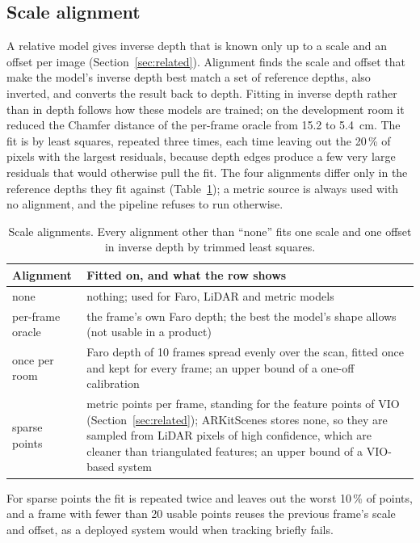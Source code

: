 \subsection{Scale alignment}\label{sec:align}
A relative model gives inverse depth that is known only up to a scale and an offset per image
(Section~\ref{sec:related}). Alignment finds the scale and offset that make the model's inverse depth best match a set
of reference depths, also inverted, and converts the result back to depth. Fitting in inverse depth rather than in
depth follows how these models are trained; on the development room it reduced the Chamfer distance of the per-frame
oracle from 15.2 to \SI{5.4}{cm}. The fit is by least squares, repeated three times, each time leaving out the
20\,\% of pixels with the largest residuals, because depth edges produce a few very large residuals that would
otherwise pull the fit. The four alignments differ only in the reference depths they fit against
(Table~\ref{tab:aligners}); a metric source is always used with no alignment, and the pipeline refuses to run
otherwise.

\begin{table}[t]
\centering\small
\caption{Scale alignments. Every alignment other than ``none'' fits one scale and one offset in inverse depth by
trimmed least squares.}
\label{tab:aligners}
\begin{tabularx}{\columnwidth}{@{}l>{\raggedright\arraybackslash}X@{}}
\toprule
Alignment & Fitted on, and what the row shows \\
\midrule
none & nothing; used for Faro, LiDAR and metric models \\
per-frame oracle & the frame's own Faro depth; the best the model's shape allows (not usable in a product) \\
once per room & Faro depth of 10 frames spread evenly over the scan, fitted once and kept for every frame; an upper
bound of a one-off calibration \\
sparse points & 200 metric points per frame, standing for the feature points of VIO (Section~\ref{sec:related});
ARKitScenes stores none, so they are sampled from LiDAR pixels of high confidence, which are cleaner than
triangulated features; an upper bound of a VIO-based system \\
\bottomrule
\end{tabularx}
\end{table}

For sparse points the fit is repeated twice and leaves out the worst 10\,\% of points, and a frame with fewer than 20
usable points reuses the previous frame's scale and offset, as a deployed system would when tracking briefly fails.

